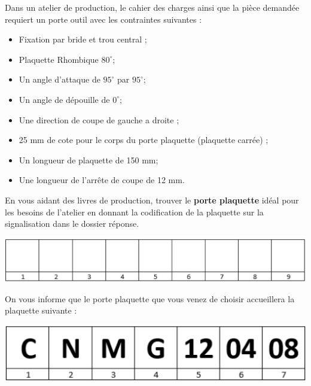\documentclass[12pt]{article}
\newcounter{exo}
\newenvironment{exo}{\stepcounter{exo}\vspace{0.5cm}{\bfseries Question \theexo\ :}}{\par\vspace{0.5cm}}
\begin{document}
\begin{tcolorbox}[colback=blue!5!white,colframe=red!75!black]
   \bcdodecaedre Dans un atelier de production, le cahier des charges ainsi que la pièce demandée requiert un porte outil avec les contraintes suivantes :

\begin{itemize}
\item Fixation par bride et trou central ;
\item Plaquette Rhombique $80^{\circ}$;
\item Un angle d'attaque de $95^{\circ}$ par $95^{\circ}$;
\item Un angle de dépouille de $0^{\circ}$;
\item Une direction de coupe de gauche a droite ;
\item 25 mm de cote pour le corps du porte plaquette (plaquette carrée) ;
\item Un longueur de plaquette de 150 mm;
\item Une longueur de l'arrête de coupe de 12 mm.
\end{itemize}
  
\end{tcolorbox}


\begin{exo} En vous aidant des livres de production, trouver le \textbf{porte plaquette} idéal pour les besoins de l'atelier en donnant la codification de la plaquette sur la signalisation dans le dossier réponse. \end{exo}
\begin{center}
\includegraphics[width=0.7\linewidth]{Images/PLA25.JPG}
\end{center}

\begin{tcolorbox}[colback=blue!5!white,colframe=red!75!black]
   \bcdodecaedre On vous informe que le porte plaquette que vous venez de choisir accueillera la plaquette suivante :
\begin{center}
\includegraphics[width=0.7\linewidth]{Images/PLA26.JPG}
\end{center}   
  
\end{tcolorbox}
\end{document}
